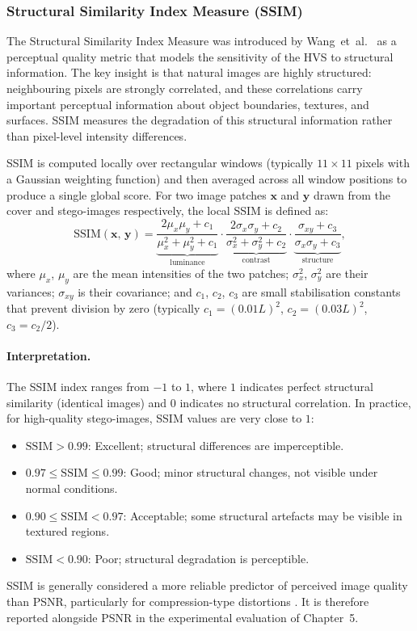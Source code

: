 \documentclass[12pt,a4paper,oneside]{report}
\begin{document}
	\subsubsection{Structural Similarity Index Measure (SSIM)}
	
	The Structural Similarity Index Measure was introduced by Wang~et~al.\ \cite{wang2004image}
	as a perceptual quality metric that models the sensitivity of the HVS to structural information.
	The key insight is that natural images are highly structured: neighbouring pixels are
	strongly correlated, and these correlations carry important perceptual information about
	object boundaries, textures, and surfaces. SSIM measures the degradation of this structural
	information rather than pixel-level intensity differences.
	
	SSIM is computed locally over rectangular windows (typically $11 \times 11$ pixels with a
	Gaussian weighting function) and then averaged across all window positions to produce a single
	global score. For two image patches $\mathbf{x}$ and $\mathbf{y}$ drawn from the cover and
	stego-images respectively, the local SSIM is defined as:
	\begin{equation}
		\mathrm{SSIM}(\mathbf{x},\, \mathbf{y}) =
		\underbrace{\frac{2\mu_x \mu_y + c_1}{\mu_x^2 + \mu_y^2 + c_1}}_{\text{luminance}}
		\cdot
		\underbrace{\frac{2\sigma_x \sigma_y + c_2}{\sigma_x^2 + \sigma_y^2 + c_2}}_{\text{contrast}}
		\cdot
		\underbrace{\frac{\sigma_{xy} + c_3}{\sigma_x \sigma_y + c_3}}_{\text{structure}},
		\label{eq:ssim}
	\end{equation}
	where $\mu_x$, $\mu_y$ are the mean intensities of the two patches; $\sigma_x^2$, $\sigma_y^2$
	are their variances; $\sigma_{xy}$ is their covariance; and $c_1$, $c_2$, $c_3$ are small
	stabilisation constants that prevent division by zero (typically $c_1 = (0.01L)^2$,
	$c_2 = (0.03L)^2$, $c_3 = c_2/2$).
	
	\paragraph{Interpretation.}
	The SSIM index ranges from $-1$ to $1$, where $1$ indicates perfect structural similarity
	(identical images) and $0$ indicates no structural correlation. In practice, for high-quality
	stego-images, SSIM values are very close to $1$:
	\begin{itemize}
		\item $\mathrm{SSIM} > 0.99$: Excellent; structural differences are imperceptible.
		\item $0.97 \leq \mathrm{SSIM} \leq 0.99$: Good; minor structural changes, not visible under
		normal conditions.
		\item $0.90 \leq \mathrm{SSIM} < 0.97$: Acceptable; some structural artefacts may be visible
		in textured regions.
		\item $\mathrm{SSIM} < 0.90$: Poor; structural degradation is perceptible.
	\end{itemize}
	SSIM is generally considered a more reliable predictor of perceived image quality than PSNR,
	particularly for compression-type distortions \cite{wang2004image}. It is therefore reported
	alongside PSNR in the experimental evaluation of Chapter~5.
	
\end{document}
